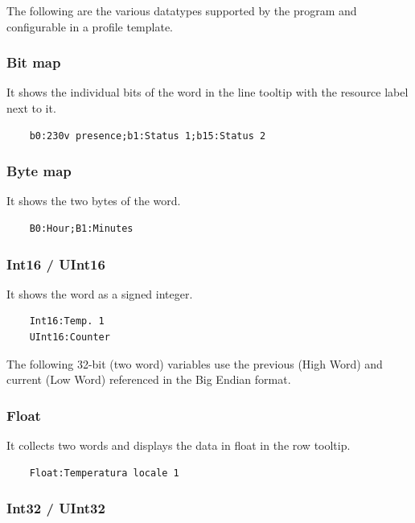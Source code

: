 The following are the various datatypes supported by the program and configurable in a profile template.

\subsubsection{Bit map}

It shows the individual bits of the word in the line tooltip with the resource label next to it.

\begin{verbatim}
    b0:230v presence;b1:Status 1;b15:Status 2
\end{verbatim}

\subsubsection{Byte map}

It shows the two bytes of the word.

\begin{verbatim}
    B0:Hour;B1:Minutes
\end{verbatim}

\subsubsection{Int16 / UInt16}

It shows the word as a signed integer.

\begin{verbatim}
    Int16:Temp. 1
    UInt16:Counter
\end{verbatim}

The following 32-bit (two word) variables use the previous (High Word) and
current (Low Word) referenced in the Big Endian format.

\subsubsection{Float}

It collects two words and displays the data in float in the row tooltip.

\begin{verbatim}
    Float:Temperatura locale 1
\end{verbatim}

\subsubsection{Int32 / UInt32}

